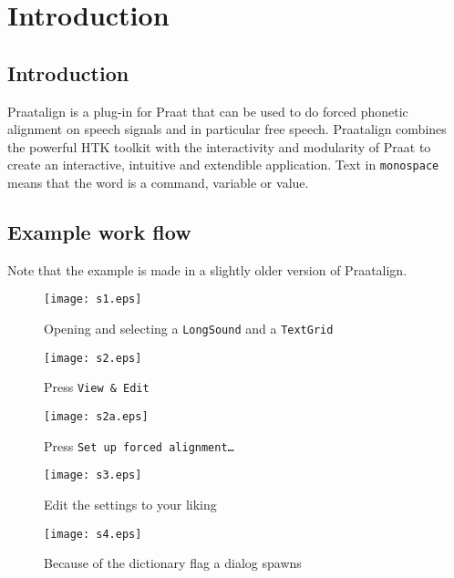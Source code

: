 
\cleardoublepage
\maketitle
\setcounter{page}{1}
\tableofcontents
\chapter{Introduction}
\section{Introduction}
Praatalign is a plug-in for Praat that can be used to do forced phonetic
alignment on speech signals and in particular free speech. Praatalign combines
the powerful HTK toolkit with the interactivity and modularity of Praat to
create an interactive, intuitive and extendible application. Text in
\texttt{monospace} means that the word is a command, variable or value.

\section{Example work flow}
Note that the example is made in a slightly older version of Praatalign.
\begin{figure}[H]
	\centering
	\texttt{[image: s1.eps]}
	\caption{Opening and selecting a \texttt{LongSound} and a \texttt{TextGrid}}
\end{figure}

\begin{figure}[H]
	\centering
	\texttt{[image: s2.eps]}
	\caption{Press \texttt{View \& Edit}}
\end{figure}

\begin{figure}[H]
	\centering
	\texttt{[image: s2a.eps]}
	\caption{Press \texttt{Set up forced alignment\ldots}}
\end{figure}

\begin{figure}[H]
	\centering
	\texttt{[image: s3.eps]}
	\caption{Edit the settings to your liking}
\end{figure}

\begin{figure}[H]
	\centering
	\texttt{[image: s4.eps]}
	\caption{Because of the dictionary flag a dialog spawns}
\end{figure}

